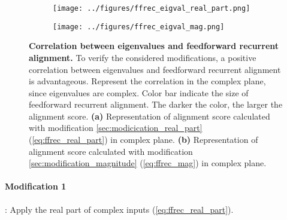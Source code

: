 \documentclass[11pt]{article}
\begin{document}
		\begin{figure}
			\centering
			\begin{subfigure}[b]{0.4\textwidth}
				\texttt{[image: ../figures/ffrec\_eigval\_real\_part.png]}
				\caption{}
				\label{fig:ffrec_real_part}
			\end{subfigure}
			\begin{subfigure}[b]{0.425\textwidth}
				\texttt{[image: ../figures/ffrec\_eigval\_mag.png]}
				\caption{}
				\label{fig:ffrec_mag}
			\end{subfigure}
			\caption{\textbf{Correlation between eigenvalues and feedforward recurrent alignment.} To verify the considered modifications, a positive correlation between eigenvalues and feedforward recurrent alignment is advantageous. Represent the correlation in the complex plane, since eigenvalues are complex. Color bar indicate the size of feedforward recurrent alignment. The darker the color, the larger the alignment score.  \textbf{(a)} Representation of alignment score calculated with modification \ref{sec:modicication_real_part} (\ref{eq:ffrec_real_part}) in complex plane. \textbf{(b)} Representation of alignment score calculated with modification \ref{sec:modification_magnitude} (\ref{eq:ffrec_mag}) in complex plane.}
		\end{figure}
	
	\paragraph{Modification 1}: Apply the real part of complex inputs (\ref{eq:ffrec_real_part}).
	
\end{document}
